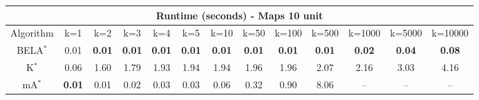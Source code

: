 \begin{tabular}{c|cccccccccccc}\toprule
\multicolumn{13}{c}{Runtime (seconds) - Maps 10 unit}\\ \midrule
Algorithm & k=1 & k=2 & k=3 & k=4 & k=5 & k=10 & k=50 & k=100 & k=500 & k=1000 & k=5000 & k=10000 \\ \midrule
BELA$^*$ & 0.01 & \textbf{0.01} & \textbf{0.01} & \textbf{0.01} & \textbf{0.01} & \textbf{0.01} & \textbf{0.01} & \textbf{0.01} & \textbf{0.01} & \textbf{0.02} & \textbf{0.04} & \textbf{0.08} \\
K$^*$ & 0.06 & 1.60 & 1.79 & 1.93 & 1.94 & 1.94 & 1.96 & 1.96 & 2.07 & 2.16 & 3.03 & 4.16 \\
mA$^*$ & \textbf{0.01} & 0.01 & 0.02 & 0.03 & 0.03 & 0.06 & 0.32 & 0.90 & 8.06 & -- & -- & -- \\ \bottomrule 
\end{tabular}
